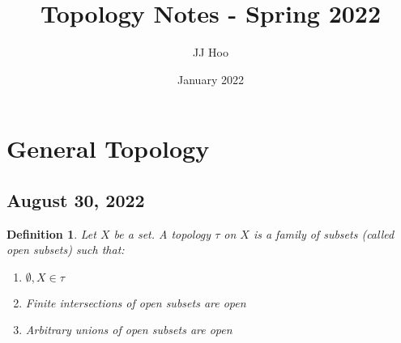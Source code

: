 \documentclass{article}
\title{Topology Notes - Spring 2022}
\author{JJ Hoo}
\date{January 2022}
\newtheorem{definition}{Definition}
\begin{document}
\maketitle
\tableofcontents
\newpage
\section{General Topology}
\subsection{August 30, 2022}
\begin{definition}
Let $X$ be a set. A topology $\tau$ on $X$ is a family of subsets (called open subsets) such that:
\begin{enumerate}
    \item $\emptyset, X\in\tau$
    \item Finite intersections of open subsets are open
    \item Arbitrary unions of open subsets are open
\end{enumerate}
\end{definition}
\end{document}
